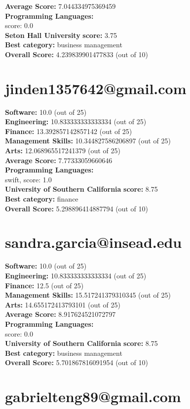 \documentclass{article}
\begin{document}
\textbf{Average Score: } 7.044334975369459\\
\textbf{Programming Languages:} \\
score: 0.0\\
\textbf{Seton Hall University} \textbf{score:} 3.75\\
\textbf{Best category: } business management\\
\textbf{Overall Score: }4.239839901477833 (out of 10)\section{jinden1357642@gmail.com}
\textbf{Software:} 10.0 (out of 25)\\
\textbf{Engineering: } 10.833333333333334 (out of 25)\\
\textbf{Finance:} 13.392857142857142 (out of 25)\\
\textbf{Management Skills:} 10.344827586206897 (out of 25)\\
\textbf{Arts:} 12.068965517241379 (out of 25)\\
\textbf{Average Score: } 7.77333059660646\\
\textbf{Programming Languages:} \\
swift, score: 1.0\\
\textbf{University of Southern California} \textbf{score:} 8.75\\
\textbf{Best category: } finance\\
\textbf{Overall Score: }5.298896414887794 (out of 10)\section{sandra.garcia@insead.edu}
\textbf{Software:} 10.0 (out of 25)\\
\textbf{Engineering: } 10.833333333333334 (out of 25)\\
\textbf{Finance:} 12.5 (out of 25)\\
\textbf{Management Skills:} 15.517241379310345 (out of 25)\\
\textbf{Arts:} 14.655172413793101 (out of 25)\\
\textbf{Average Score: } 8.917624521072797\\
\textbf{Programming Languages:} \\
score: 0.0\\
\textbf{University of Southern California} \textbf{score:} 8.75\\
\textbf{Best category: } business management\\
\textbf{Overall Score: }5.701867816091954 (out of 10)\section{gabrielteng89@gmail.com}
\end{document}
